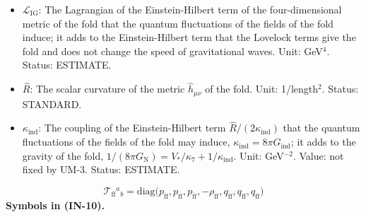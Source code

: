 \documentclass[
  10pt,
]{article}
\providecommand{\tightlist}{%
  \setlength{\itemsep}{0pt}\setlength{\parskip}{0pt}}
\begin{document}
\begin{itemize}
\tightlist
\item
  \(\mathcal{L}_{\mathrm{IG}}\): The Lagrangian of the Einstein-Hilbert
  term of the four-dimensional metric of the fold that the quantum
  fluctuations of the fields of the fold induce; it adds to the
  Einstein-Hilbert term that the Lovelock terms give the fold and does
  not change the speed of gravitational waves. Unit: GeV\(^4\). Status:
  ESTIMATE.
\item
  \(\hat R\): The scalar curvature of the metric \(\hat h_{\mu\nu}\) of
  the fold. Unit: 1/length\(^2\). Status: STANDARD.
\item
  \(\kappa_{\mathrm{ind}}\): The coupling of the Einstein-Hilbert term
  \(\hat R/(2\kappa_{\mathrm{ind}})\) that the quantum fluctuations of
  the fields of the fold may induce,
  \(\kappa_{\mathrm{ind}} = 8\pi G_{\mathrm{ind}}\); it adds to the
  gravity of the fold,
  \(1/(8\pi G_{\mathrm{N}}) = V_*/\kappa_7 + 1/\kappa_{\mathrm{ind}}\).
  Unit: GeV\(^{-2}\). Value: not fixed by UM-3. Status: ESTIMATE.
\end{itemize}

\[
\mathcal{T}_{\mathrm{ff}}{}^a{}_b = \mathrm{diag}\big(p_{\mathrm{ff}}, p_{\mathrm{ff}}, p_{\mathrm{ff}}, -\rho_{\mathrm{ff}},
 q_{\mathrm{ff}}, q_{\mathrm{ff}}, q_{\mathrm{ff}}\big) \tag{IN-10}
\] \textbf{Symbols in (IN-10).}
\end{document}
